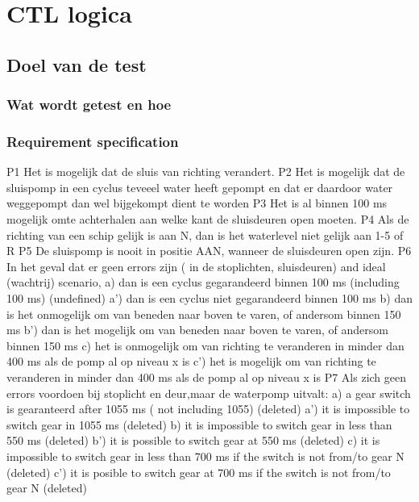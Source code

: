 \chapter{CTL logica}


\section{Doel van de test}
\subsection{Wat wordt getest en hoe}


\subsection{Requirement specification}



P1 Het is mogelijk dat de sluis van richting verandert.
P2 Het is mogelijk dat de sluispomp in een cyclus teveeel water heeft gepompt en dat er daardoor water weggepompt dan wel bijgekompt dient te worden
P3 Het is al binnen 100 ms mogelijk omte achterhalen aan welke kant de sluisdeuren  open moeten.
P4 Als de richting van een schip gelijk is aan N, dan is het waterlevel niet gelijk aan 1-5 of R
P5 De sluispomp is nooit in positie AAN, wanneer de sluisdeuren open zijn.
P6 In het geval dat er geen errors zijn (  in de stoplichten, sluisdeuren) and ideal (wachtrij) scenario,
a) dan is een cyclus gegarandeerd binnen 100 ms (including 100 ms) (undefined)
a') dan is een cyclus niet gegarandeerd binnen 100 ms
b)  dan is het onmogelijk om van beneden naar boven te varen, of andersom binnen 150 ms
b') dan is het mogelijk om van beneden naar boven te varen, of andersom binnen 150 ms
c) het is onmogelijk om van richting te veranderen in minder dan 400 ms als de pomp al op niveau x is
c') het is mogelijk om van richting te veranderen in minder dan 400 ms als de pomp al op niveau x is
P7 Als zich geen errors voordoen bij stoplicht en deur,maar de waterpomp uitvalt:
a)  a gear switch is gearanteerd after 1055 ms ( not including  1055)  (deleted)
a') it is impossible  to switch gear in 1055 ms     (deleted)
b) it is  impossible to switch gear in less than 550 ms (deleted)
b') it is possible to switch gear at 550 ms (deleted)
c) it is impossible to switch  gear in  less than 700 ms if the switch is not from/to gear N (deleted)
c') it is posible to switch gear at 700 ms if the switch is not from/to gear N (deleted)


